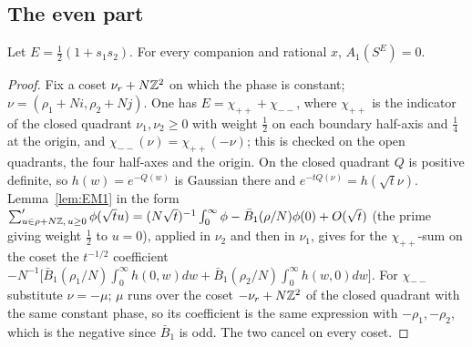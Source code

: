 \subsection{The even part}
\begin{theorem}\label{thm:evenA1}
Let $E=\frac12(1+s_1s_2)$. For every companion and rational $x$, $A_1(S^E)=0$.
\end{theorem}
\begin{proof}
Fix a coset $\nu_r+N\mathbb{Z}^2$ on which the phase is constant; $\nu=(\rho_1+Ni,\rho_2+Nj)$. One has $E=\chi_{++}+\chi_{--}$, where $\chi_{++}$ is the indicator of
the closed quadrant $\nu_1,\nu_2\ge0$ with weight $\frac12$ on each boundary half-axis and $\frac14$ at the origin, and $\chi_{--}(\nu)=\chi_{++}(-\nu)$; this is checked on the
open quadrants, the four half-axes and the origin. On the closed quadrant $Q$ is positive definite, so $h(w)=e^{-Q(w)}$ is Gaussian there and $e^{-tQ(\nu)}=h(\sqrt t\nu)$.
Lemma~\ref{lem:EM1} in the form $\sum'_{u\in\rho+N\mathbb{Z},\,u\ge0}\phi(\sqrt tu)=(N\sqrt t)^{-1}\int_0^\infty\phi-\bar B_1(\rho/N)\phi(0)+O(\sqrt t)$ (the prime giving weight $\frac12$
to $u=0$), applied in $\nu_2$ and then in $\nu_1$, gives for the $\chi_{++}$-sum on the coset the $t^{-1/2}$ coefficient
$-N^{-1}\big[\bar B_1(\rho_1/N)\int_0^\infty h(0,w)dw+\bar B_1(\rho_2/N)\int_0^\infty h(w,0)dw\big]$. For $\chi_{--}$ substitute $\nu=-\mu$; $\mu$ runs over the coset
$-\nu_r+N\mathbb{Z}^2$ of the closed quadrant with the same constant phase, so its coefficient is the same expression with $-\rho_1,-\rho_2$, which is the negative since $\bar B_1$
is odd. The two cancel on every coset.
\end{proof}

